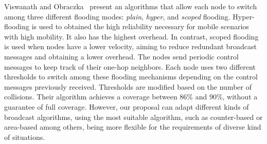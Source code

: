 Viswanath and Obraczka~\cite{Viswanath02anadaptive} present an algorithms
that allow each node to switch among three different flooding modes: \emph{plain}, \emph{hyper}, and \emph{scoped} flooding. 
Hyper-flooding is used to obtained the high reliability necessary for mobile scenarios with high mobility. It also has the highest overhead.
In contrast, scoped flooding is used when nodes have a lower velocity, aiming to reduce redundant broadcast messages and obtaining a lower overhead.
The nodes send periodic control messages to keep track of their one-hop neighbors.
Each node uses two different thresholds to switch among these flooding mechanisms depending on the control messages previously received. 
Thresholds are modified based on the number of collisions. 
Their algorithm achieves a coverage between 86\% and 90\%, without a guarantee of full coverage. 
However, our proposal can adapt different kinds of broadcast algorithms, using the most suitable algorithm, such as counter-based or area-based among others, being more flexible for the requirements of diverse kind of situations.

